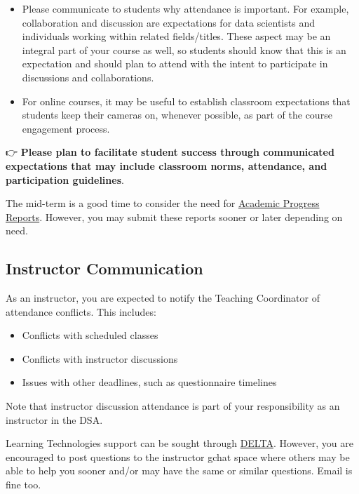 \documentclass[
]{book}
\providecommand{\tightlist}{%
  \setlength{\itemsep}{0pt}\setlength{\parskip}{0pt}}
\begin{document}
\begin{itemize}
\item
  Please communicate to students why attendance is important. For example, collaboration and discussion are expectations for data scientists and individuals working within related fields/titles. These aspect may be an integral part of your course as well, so students should know that this is an expectation and should plan to attend with the intent to participate in discussions and collaborations.
\item
  For online courses, it may be useful to establish classroom expectations that students keep their cameras on, whenever possible, as part of the course engagement process.
\end{itemize}

👉 { \textbf{Please plan to facilitate student success through communicated expectations that may include classroom norms, attendance, and participation guidelines}. }

The mid-term is a good time to consider the need for \href{https://dasa.ncsu.edu/faculty-resources/academic-progress-reporting/}{Academic Progress Reports}. However, you may submit these reports sooner or later depending on need.

\subsection{Instructor Communication}\label{instructor-communication}

As an instructor, you are expected to notify the Teaching Coordinator of attendance conflicts. This includes:

\begin{itemize}
\tightlist
\item
  Conflicts with scheduled classes
\item
  Conflicts with instructor discussions
\item
  Issues with other deadlines, such as questionnaire timelines
\end{itemize}

Note that instructor discussion attendance is part of your responsibility as an instructor in the DSA.

Learning Technologies support can be sought through \href{https://delta.ncsu.edu/learntech-request/}{DELTA}. However, you are encouraged to post questions to the instructor gchat space where others may be able to help you sooner and/or may have the same or similar questions. Email is fine too.
\end{document}

